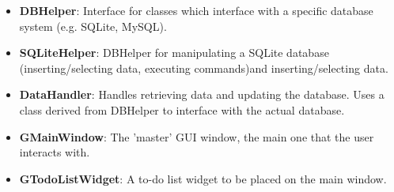 \newcommand{\classitem}[1]{\item \textbf{#1}}

\begin{itemize}
    \classitem{DBHelper}: Interface for classes which interface with a specific
    database system (e.g. SQLite, MySQL).
    \classitem{SQLiteHelper}: DBHelper for manipulating a SQLite database
    (inserting/selecting data, executing commands)and inserting/selecting data.
    \classitem{DataHandler}: Handles retrieving data and updating the database.
    Uses a class derived from DBHelper to interface with the actual database.
\end{itemize}

\begin{itemize}
    \classitem{GMainWindow}: The 'master' GUI window, the main one that the
        user interacts with.
    \classitem{GTodoListWidget}: A to-do list widget to be placed on the main
        window.
\end{itemize}
